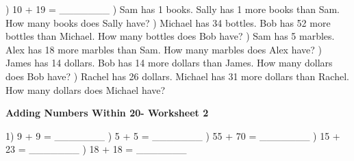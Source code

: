 \documentclass{article}%
\begin{document}
) 10 + 19 = \_\_\_\_\_\_\_%
\newline%
\newline%
) Sam has 1 books. Sally has 1 more books than Sam. How many books does Sally have?%
\newline%
\newline%
) Michael has 34 bottles. Bob has 52 more bottles than Michael. How many bottles does Bob have?%
\newline%
\newline%
) Sam has 5 marbles. Alex has 18 more marbles than Sam. How many marbles does Alex have?%
\newline%
\newline%
) James has 14 dollars. Bob has 14 more dollars than James. How many dollars does Bob have?%
\newline%
\newline%
) Rachel has 26 dollars. Michael has 31 more dollars than Rachel. How many dollars does Michael have?%
\newline%
\newline%
\newline%
\pagebreak%
\large%
\begin{center}%
\textbf{Adding Numbers Within 20- Worksheet 2}%
\newline%
\newline%
\newline%
\end{center} \normalsize%
1) 9 + 9 = \_\_\_\_\_\_\_%
\newline%
\newline%
) 5 + 5 = \_\_\_\_\_\_\_%
\newline%
\newline%
) 55 + 70 = \_\_\_\_\_\_\_%
\newline%
\newline%
) 15 + 23 = \_\_\_\_\_\_\_%
\newline%
\newline%
) 18 + 18 = \_\_\_\_\_\_\_%
\newline%
\newline%
\end{document}
